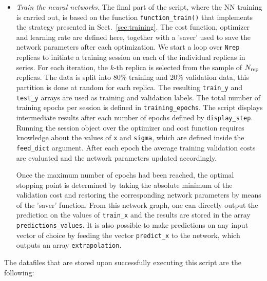 \begin{itemize}
\item {\it Train the neural networks.}
  The final part of the script, where the NN training is  carried out,
  is based on the function {\tt function\_train()} that
  implements the strategy presented in Sect.~\ref{sec:training}.
%
The cost function, optimizer and learning rate are defined here, together with a 'saver' used to 
save the network parameters after each optimization. 
%
We start a loop over {\tt Nrep} replicas to initiate a training session on each of the individual replicas
in series. 
%
For each iteration, the $k$-th replica is selected from the sample of $N_{\rm rep}$ replicas.
%
The data is split into 80\% training and 20\% validation data, this partition is done 
at random for each replica. The resulting {\tt train\_y} and {\tt test\_y} arrays are used
as training and validation labels.
%
The total number of training epochs per session is defined in {\tt training\_epochs}.
%
The script displays intermediate 
results after each number of epochs defined by {\tt display\_step}. 
%
Running the session object over the optimizer and cost function requires knowledge about the values of {\tt x} and {\tt sigma}, which 
are defined inside the {\tt feed\_dict} argument. 
%
After each epoch the average training  validation costs are evaluated
and the network parameters  updated accordingly.

Once the maximum number of epochs 
had been reached, the optimal stopping point is determined by 
taking the absolute minimum of the validation cost
and restoring the corresponding network parameters by means of the 'saver' function.
%
From this network graph, one can directly output the prediction on the values of {\tt train\_x} and
the results are stored in the array {\tt predictions\_values}.
%
It is also possible to make predictions on any input vector of choice by feeding 
the vector {\tt predict\_x} to the 
network, which outputs an array {\tt extrapolation}.

\end{itemize}

The datafiles that are stored upon successfully
executing this script are the following:

